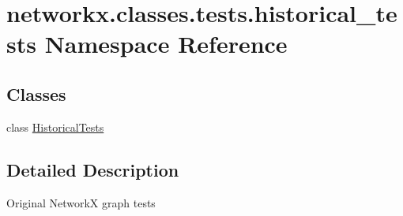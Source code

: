 \hypertarget{namespacenetworkx_1_1classes_1_1tests_1_1historical__tests}{}\section{networkx.\+classes.\+tests.\+historical\+\_\+tests Namespace Reference}
\label{namespacenetworkx_1_1classes_1_1tests_1_1historical__tests}
\subsection*{Classes}
\begin{DoxyCompactItemize}
\item 
class \hyperlink{classnetworkx_1_1classes_1_1tests_1_1historical__tests_1_1HistoricalTests}{Historical\+Tests}
\end{DoxyCompactItemize}


\subsection{Detailed Description}
\begin{DoxyVerb}Original NetworkX graph tests\end{DoxyVerb}
 